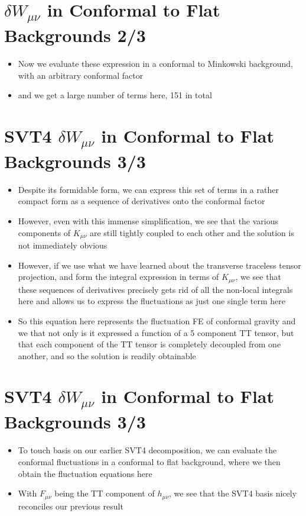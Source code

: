 \documentclass[10pt,letterpaper]{article}
\numberwithin{equation}{section}
\begin{document}
\section{$\delta W_{\mu\nu}$ in Conformal to Flat Backgrounds 2/3}
\begin{itemize}
	\item Now we evaluate these expression in a conformal to Minkowski background, with an arbitrary conformal factor
	\item and we get a large number of terms here, 151 in total
\end{itemize}


\section{SVT4 $\delta W_{\mu\nu}$ in Conformal to Flat Backgrounds 3/3}
\begin{itemize}
	\item Despite its formidable form, we can express this set of terms in a rather compact form as a sequence of derivatives onto the conformal factor
	\item However, even with this immense simplification, we see that the various components of $K_{\mu\nu}$ are still tightly coupled to each other and the solution is not immediately obvious
	\item However, if we use what we have learned about the transverse traceless tensor projection, and form the integral expression in terms of $K_{\mu\nu}$, we see that these sequences of derivatives precisely gets rid of all the non-local integrals here and allows us to express the fluctuations as just one single term here
	\item So this equation here represents the fluctuation FE of conformal gravity and we that not only is it expressed a function of a 5 component TT tensor, but that each component of the TT tensor is completely decoupled from one another, and so the solution is readily obtainable
\end{itemize}


\section{SVT4 $\delta W_{\mu\nu}$ in Conformal to Flat Backgrounds 3/3}
\begin{itemize}
	\item To touch basis on our earlier SVT4 decomposition, we can evaluate the conformal fluctuations in a conformal to flat background, where we then obtain the fluctuation equations here
	\item With $F_{\mu\nu}$ being the TT component of $h_{\mu\nu}$, we see that the SVT4 basis nicely reconciles our previous result
\end{itemize}
\end{document}
